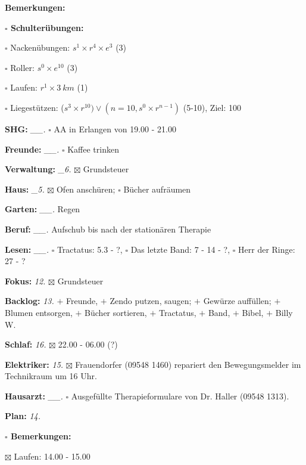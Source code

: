 \documentclass[10pt,a4paper]{article}
\newcommand\prop[1] {{\color {alizarin} {\bf #1}}}        %
\newcommand\opti[1] {{\color {amethyst} {\bf #1}}}        %
\newcommand\mand[1] {{\color {burntorange} {\bf #1}}}     %
\newcommand\topspace{\vskip -15pt \hskip 20pt}
\newcommand\bottomspace{\vskip 4pt}
\newcommand\n[1] { {\sl #1.} \hskip 5pt }
\begin{document}
\begin{mdframed}[style=daystyle]
\begin{labeling}{{\mand {Bemerkungen:}}}
\begin{minipage}{0.75\textwidth}
\begin{labeling}{\prop {$\square$ {Schulterübungen:}}}
      \item[$\square$ Nackenübungen:]   $s^1 \times r^4 \times e^3$ (3)
      \item[$\square$ Roller:]          $s^0 \times e^{10}$ (3)
      \item[$\square$ Laufen:]          $r^1 \times 3\ km$ (1)
      \item[$\square$ Liegestützen:]    ($s^3 \times r^{10}) \vee (n=10, s^0 \times r^{n-1})$ (5-10), Ziel: 100
      \end{labeling}
    \end{minipage}
    \bottomspace        
  \item[{\mand {SHG:}}]          \n{\_\_} $\square$ AA in Erlangen von 19.00 - 21.00
  \item[{\mand {Freunde:}}]      \n{\_\_} $\square$ Kaffee trinken
  \item[{\mand {Verwaltung:}}]    \n{\_6} $\boxtimes$ Grundsteuer
  \item[{\mand {Haus:}}]          \n{\_5} $\boxtimes$ Ofen anschüren; $\square$ Bücher aufräumen
  \item[{\mand {Garten:}}]       \n{\_\_} Regen
  \item[{\mand {Beruf:}}]        \n{\_\_} Aufschub bis nach der stationären Therapie
  \item[{\mand {Lesen:}}]        \n{\_\_} $\square$ Tractatus: 5.3 - ?,
      $\square$ Das letzte Band: 7 - 14 - ?, $\square$ Herr der Ringe: 27 - ?
  \item[{\mand {Fokus:}}]          \n{12} $\boxtimes$ Grundsteuer
  \item[{\mand {Backlog:}}]        \n{13} $+$ Freunde,
    $+$ Zendo putzen, saugen; $+$ Gewürze auffüllen; $+$ Blumen entsorgen, $+$ Bücher sortieren,
    $+$ Tractatus, $+$ Band, $+$ Bibel, $+$ Billy W.
  \item[{\mand {Schlaf:}}]       \n{16} $\boxtimes$ 22.00 - 06.00 (?)
  \item[{\opti {Elektriker:}}]     \n{15} $\boxtimes$ Frauendorfer (09548 1460) repariert den
      Bewegungsmelder im Technikraum um 16 Uhr.
  \item[{\opti {Hausarzt:}}]     \n{\_\_} $\square$ Ausgefüllte Therapieformulare von
    Dr. Haller (09548 1313).
  \item[{\mand {Plan:}}]           \n{14}
    \topspace
    \begin{minipage}{0.75\textwidth}  
      \begin{labeling}{\prop {$\square$ {Bemerkungen:}}} 
        \setlength\itemsep{-3pt}
      \item[$\boxtimes$ Laufen:]      14.00 - 15.00

\end{labeling}
\end{minipage}
\end{labeling}
\end{mdframed}
\end{document}
